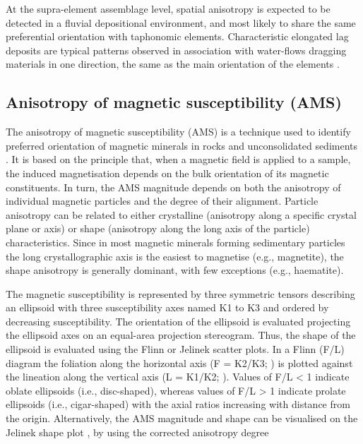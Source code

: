 \documentclass[review,times,authoryear]{elsarticle} %
\begin{document}
At the supra-element assemblage level, spatial anisotropy is expected to be detected in a fluvial depositional environment, and most likely to share the same preferential orientation with taphonomic elements. Characteristic elongated lag deposits are typical patterns observed in association with water-flows dragging materials in one direction, the same as the main orientation of the elements \citep{Dominguez-Rodrigo2012}.

\subsection{Anisotropy of magnetic susceptibility (AMS)}

The anisotropy of magnetic susceptibility (AMS) is a technique used to identify preferred orientation of magnetic minerals in rocks and unconsolidated sediments \citep{Hrouda1982,Tarling1993}. It is based on the principle that, when a magnetic field is applied to a sample, the induced magnetisation depends on the bulk orientation of its magnetic constituents. In turn, the AMS magnitude depends on both the anisotropy of individual magnetic particles and the degree of their alignment. Particle anisotropy can be related to either crystalline (anisotropy along a specific crystal plane or axis) or shape (anisotropy along the long axis of the particle) characteristics. Since in most magnetic minerals forming sedimentary particles the long crystallographic axis is the easiest to magnetise (e.g., magnetite), the shape anisotropy is generally dominant, with few exceptions (e.g., haematite).

The magnetic susceptibility is represented by three symmetric tensors describing an ellipsoid with three susceptibility axes named K1 to K3 and ordered by decreasing susceptibility. The orientation of the ellipsoid is evaluated projecting the ellipsoid axes on an equal-area projection stereogram. Thus, the shape of the ellipsoid is evaluated using the Flinn or Jelinek scatter plots. In a Flinn (F/L) diagram the foliation along the horizontal axis (F = K2/K3; \citealp{Stacey1960}) is plotted against the lineation along the vertical axis (L = K1/K2; \citealp{Balsey1960}). Values of F/L < 1 indicate oblate ellipsoids (i.e., disc-shaped), whereas values of F/L > 1 indicate prolate ellipsoids (i.e., cigar-shaped) with the axial ratios increasing with distance from the origin. Alternatively, the AMS magnitude and shape can be visualised on the Jelinek shape plot \citep{Jelinek1981}, by using the corrected anisotropy degree
\end{document}
